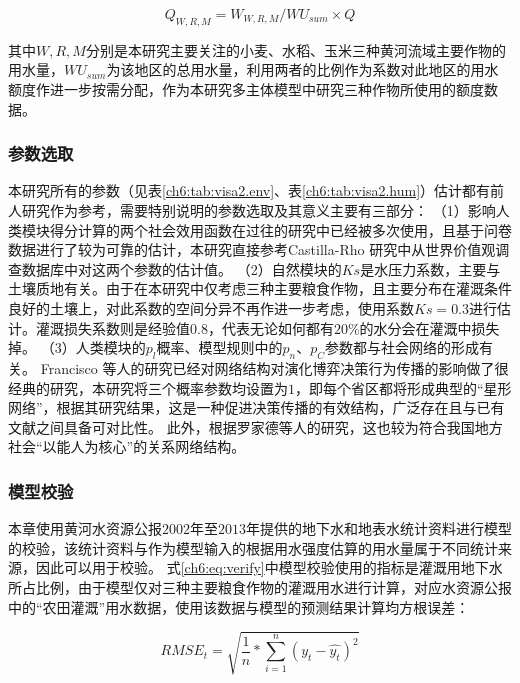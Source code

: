 \begin{equation}
    Q_{W, R, M} = W_{W, R, M} / WU_{sum} \times Q
\end{equation}

其中$W, R, M$分别是本研究主要关注的小麦、水稻、玉米三种黄河流域主要作物的用水量，$WU_{sum}$为该地区的总用水量，利用两者的比例作为系数对此地区的用水额度作进一步按需分配，作为本研究多主体模型中研究三种作物所使用的额度数据。



\subsubsection{参数选取}

本研究所有的参数（见表\ref{ch6:tab:visa2.env}、表\ref{ch6:tab:visa2.hum}）估计都有前人研究作为参考，需要特别说明的参数选取及其意义主要有三部分：
（1）影响人类模块得分计算的两个社会效用函数在过往的研究中已经被多次使用，且基于问卷数据进行了较为可靠的估计，本研究直接参考Castilla-Rho 研究中从世界价值观调查数据库中对这两个参数的估计值\cite{castilla-rho2015, castilla-rho2017, castilla-rho2020}。
（2）自然模块的$Ks$是水压力系数，主要与土壤质地有关。由于在本研究中仅考虑三种主要粮食作物，且主要分布在灌溉条件良好的土壤上，对此系数的空间分异不再作进一步考虑，使用系数$Ks = 0.3$进行估计。灌溉损失系数则是经验值$0.8$，代表无论如何都有$20\%$的水分会在灌溉中损失掉。
（3）人类模块的$p_l$概率、模型规则中的$p_n$、$p_C$参数都与社会网络的形成有关。
Francisco 等人的研究已经对网络结构对演化博弈决策行为传播的影响做了很经典的研究\cite{santos2008}，本研究将三个概率参数均设置为$1$，即每个省区都将形成典型的“星形网络”，根据其研究结果，这是一种促进决策传播的有效结构，广泛存在且与已有文献之间具备可对比性\cite{santos2008}。
此外，根据罗家德等人的研究，这也较为符合我国地方社会“以能人为核心”的关系网络结构\cite{luojiade2013}。

\subsubsection{模型校验}

本章使用黄河水资源公报$2002$年至$2013$年提供的地下水和地表水统计资料进行模型的校验，该统计资料与作为模型输入的根据用水强度估算的用水量属于不同统计来源，因此可以用于校验。
式\ref{ch6:eq:verify}中模型校验使用的指标是灌溉用地下水所占比例，由于模型仅对三种主要粮食作物的灌溉用水进行计算，对应水资源公报中的“农田灌溉”用水数据，使用该数据与模型的预测结果计算均方根误差：

\begin{equation}
    \label{ch6:eq:rmse}
    RMSE_t = \sqrt{\frac{1}{n}*\sum_{i=1}^{n}{(y_t - \hat{y_t})}^2}
\end{equation}


